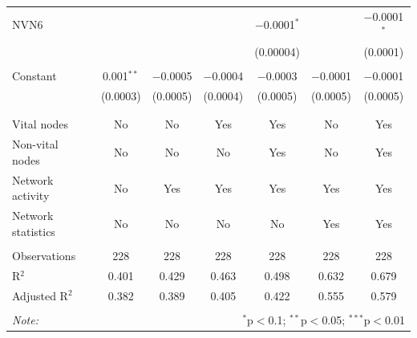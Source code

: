 \begin{table}[!htbp]
\begin{tabular}{@{\extracolsep{5pt}}lcccccc}
 NVN6 &  &  &  & $-$0.0001$^{*}$ &  & $-$0.0001$^{*}$ \\ 
  &  &  &  & (0.00004) &  & (0.0001) \\ 
  & & & & & & \\ 
 Constant & 0.001$^{**}$ & $-$0.0005 & $-$0.0004 & $-$0.0003 & $-$0.0001 & $-$0.0001 \\ 
  & (0.0003) & (0.0005) & (0.0004) & (0.0005) & (0.0005) & (0.0005) \\ 
  & & & & & & \\ 
\hline \\[-1.8ex] 
Vital nodes & No & No & Yes & Yes & No & Yes \\ 
Non-vital nodes & No & No & No & Yes & No & Yes \\ 
Network activity & No & Yes & Yes & Yes & Yes & Yes \\ 
Network statistics & No & No & No & No & Yes & Yes \\ 
\hline &  &  &  &  &  &  \\ 
Observations & 228 & 228 & 228 & 228 & 228 & 228 \\ 
R$^{2}$ & 0.401 & 0.429 & 0.463 & 0.498 & 0.632 & 0.679 \\ 
Adjusted R$^{2}$ & 0.382 & 0.389 & 0.405 & 0.422 & 0.555 & 0.579 \\ 
\hline 
\hline \\[-1.8ex] 
\textit{Note:}  & \multicolumn{6}{r}{$^{*}$p$<$0.1; $^{**}$p$<$0.05; $^{***}$p$<$0.01} \\ 
\end{tabular} 
\end{table} 

